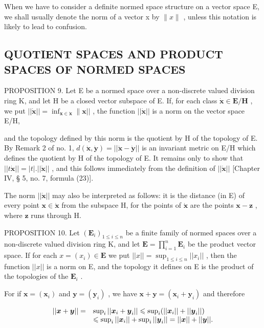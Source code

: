 When we have to consider a definite normed space structure on a vector space E, we shall usually denote the norm of a vector x by \(\|x\|\) , unless this notation is likely to lead to confusion.

\subsection{QUOTIENT SPACES AND PRODUCT SPACES OF NORMED SPACES}

PROPOSITION 9. Let E be a normed space over a non-discrete valued division ring K, and let H be a closed vector subspace of E. If, for each class \(\dot{\mathbf{x}}\in\mathbf{E}/\mathbf{H}\) , we put \(||\dot{\mathbf{x}}||=\inf_{\mathbf{x}\in\dot{\mathbf{x}}}\|\mathbf{x}||\) , the function \(||\dot{\mathbf{x}}||\) is a norm on the vector space E/H,

and the topology defined by this norm is the quotient by H of the topology of E. By Remark 2 of no. 1, \(d(\dot{\boldsymbol{x}}, \dot{\boldsymbol{y}}) = ||\dot{\boldsymbol{x}} - \dot{\boldsymbol{y}}||\) is an invariant metric on E/H which defines the quotient by H of the topology of E. It remains only to show that \(||t\dot{\boldsymbol{x}}|| = |t|.||\dot{\boldsymbol{x}}||\) , and this follows immediately from the definition of \(||\dot{\boldsymbol{x}}||\) {[}Chapter IV, § 5, no. 7, formula (23){]}.

The norm \(||\dot{\pmb{x}}||\) may also be interpreted as follows: it is the distance (in E) of every point \(\pmb{x} \in \dot{\pmb{x}}\) from the subspace H, for the points of \(\dot{\pmb{x}}\) are the points \(\pmb{x} - \pmb{z}\) , where \(\pmb{z}\) runs through H.

PROPOSITION 10. Let \((\mathbf{E}_i)_{1 \leqslant i \leqslant n}\) be a finite family of normed spaces over a non-discrete valued division ring K, and let \(\mathbf{E} = \prod_{i=1}^{n} \mathbf{E}_i\) be the product vector space. If for each \(x = (x_i) \in \mathbf{E}\) we put \(||x|| = \sup_{1 \leqslant i \leqslant n} ||x_i||\) , then the function \(||x||\) is a norm on E, and the topology it defines on E is the product of the topologies of the \(\mathbf{E}_i\) .

For if \(\pmb{x} = (\pmb{x}_i)\) and \(\pmb{y} = (\pmb{y}_i)\) , we have \(\pmb{x} + \pmb{y} = (\pmb{x}_i + \pmb{y}_i)\) and therefore

\[
\begin{array}{r l} | | \boldsymbol {x} + \boldsymbol {y} | | = & \sup _ {i} | | \boldsymbol {x} _ {i} + \boldsymbol {y} _ {i} | | \leqslant \sup _ {i} (| | \boldsymbol {x} _ {i} | | + | | \boldsymbol {y} _ {i} | |) \\ & \leqslant \sup _ {i} | | \boldsymbol {x} _ {i} | | + \sup _ {i} | | \boldsymbol {y} _ {i} | | = | | \boldsymbol {x} | | + | | \boldsymbol {y} | |. \end{array}
\]

